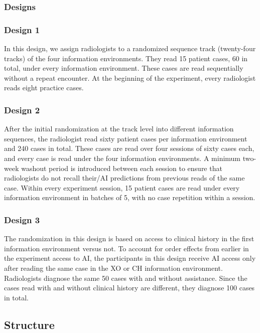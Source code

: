 \documentclass[fleqn,10pt]{wlscirep}
\begin{document}
\subsubsection*{Designs}

\subsubsection*{Design 1}

In this design, we assign radiologists to a randomized sequence track (twenty-four tracks) of the four information environments. They read 15 patient cases, 60 in total, under every information environment. These cases are read sequentially without a repeat encounter. At the beginning of the experiment, every radiologist reads eight practice cases.

\subsubsection*{Design 2}

After the initial randomization at the track level into different information sequences, the radiologist read sixty patient cases per information environment and 240 cases in total. These cases are read over four sessions of sixty cases each, and every case is read under the four information environments. A minimum two-week washout period is introduced between each session to ensure that radiologists do not recall their/AI predictions from previous reads of the same case. Within every experiment session, 15 patient cases are read under every information environment in batches of 5, with no case repetition within a session.

\subsubsection*{Design 3}

The randomization in this design is based on access to clinical history in the first information environment versus not. To account for order effects from earlier in the experiment access to AI, the participants in this design receive AI access only after reading the same case in the XO or CH information environment. Radiologists diagnose the same 50 cases with and without assistance. Since the cases read with and without clinical history are different, they diagnose 100 cases in total.

\subsection*{Structure}
\end{document}
